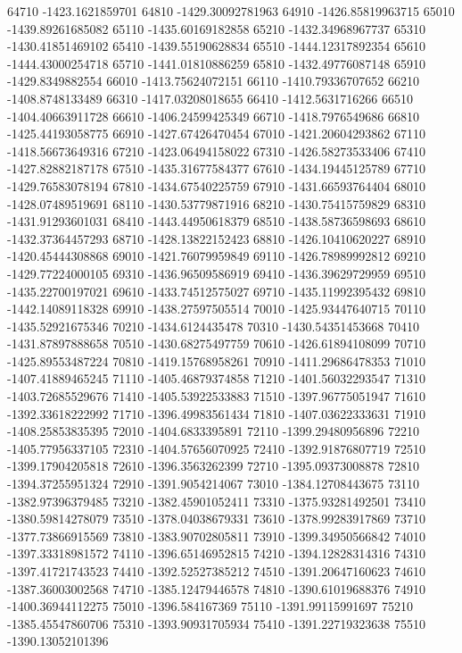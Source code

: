 {64710 -1423.1621859701
64810 -1429.30092781963
64910 -1426.85819963715
65010 -1439.89261685082
65110 -1435.60169182858
65210 -1432.34968967737
65310 -1430.41851469102
65410 -1439.55190628834
65510 -1444.12317892354
65610 -1444.43000254718
65710 -1441.01810886259
65810 -1432.49776087148
65910 -1429.8349882554
66010 -1413.75624072151
66110 -1410.79336707652
66210 -1408.8748133489
66310 -1417.03208018655
66410 -1412.5631716266
66510 -1404.40663911728
66610 -1406.24599425349
66710 -1418.7976549686
66810 -1425.44193058775
66910 -1427.67426470454
67010 -1421.20604293862
67110 -1418.56673649316
67210 -1423.06494158022
67310 -1426.58273533406
67410 -1427.82882187178
67510 -1435.31677584377
67610 -1434.19445125789
67710 -1429.76583078194
67810 -1434.67540225759
67910 -1431.66593764404
68010 -1428.07489519691
68110 -1430.53779871916
68210 -1430.75415759829
68310 -1431.91293601031
68410 -1443.44950618379
68510 -1438.58736598693
68610 -1432.37364457293
68710 -1428.13822152423
68810 -1426.10410620227
68910 -1420.45444308868
69010 -1421.76079959849
69110 -1426.78989992812
69210 -1429.77224000105
69310 -1436.96509586919
69410 -1436.39629729959
69510 -1435.22700197021
69610 -1433.74512575027
69710 -1435.11992395432
69810 -1442.14089118328
69910 -1438.27597505514
70010 -1425.93447640715
70110 -1435.52921675346
70210 -1434.6124435478
70310 -1430.54351453668
70410 -1431.87897888658
70510 -1430.68275497759
70610 -1426.61894108099
70710 -1425.89553487224
70810 -1419.15768958261
70910 -1411.29686478353
71010 -1407.41889465245
71110 -1405.46879374858
71210 -1401.56032293547
71310 -1403.72685529676
71410 -1405.53922533883
71510 -1397.96775051947
71610 -1392.33618222992
71710 -1396.49983561434
71810 -1407.03622333631
71910 -1408.25853835395
72010 -1404.6833395891
72110 -1399.29480956896
72210 -1405.77956337105
72310 -1404.57656070925
72410 -1392.91876807719
72510 -1399.17904205818
72610 -1396.3563262399
72710 -1395.09373008878
72810 -1394.37255951324
72910 -1391.9054214067
73010 -1384.12708443675
73110 -1382.97396379485
73210 -1382.45901052411
73310 -1375.93281492501
73410 -1380.59814278079
73510 -1378.04038679331
73610 -1378.99283917869
73710 -1377.73866915569
73810 -1383.90702805811
73910 -1399.34950566842
74010 -1397.33318981572
74110 -1396.65146952815
74210 -1394.12828314316
74310 -1397.41721743523
74410 -1392.52527385212
74510 -1391.20647160623
74610 -1387.36003002568
74710 -1385.12479446578
74810 -1390.61019688376
74910 -1400.36944112275
75010 -1396.584167369
75110 -1391.99115991697
75210 -1385.45547860706
75310 -1393.90931705934
75410 -1391.22719323638
75510 -1390.13052101396
}
